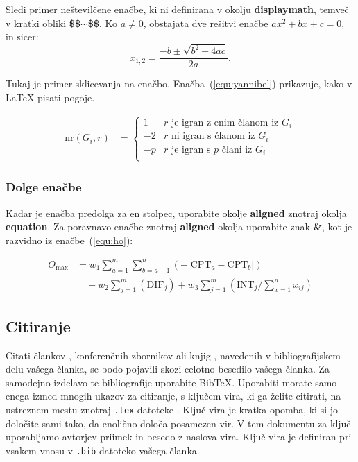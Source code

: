 \documentclass[article,slovene]{stucosrec}
\newcommand{\latex}{\LaTeX\xspace}
\newcommand{\bibtex}{Bib\TeX\xspace}
\begin{document}
	Sledi primer neštevilčene enačbe, ki ni definirana v okolju \textbf{displaymath}, temveč v kratki obliki \textbf{\$\$$\cdots$\$\$}.
	Ko $a \ne 0$, obstajata dve rešitvi enačbe $ax^2 + bx + c = 0$, in sicer: $$x_{1, 2} = \frac{-b \pm \sqrt{b^2-4ac}}{2a}.$$
	
	Tukaj je primer sklicevanja na enačbo. Enačba~(\ref{equ:yannibel}) prikazuje, kako v \latex pisati pogoje.
	
	\begin{equation}
		\begin{aligned} 
			\mathrm{nr}(G_i,r) & = \label{equ:yannibel}
			\begin{cases}
				1  & \text{$r$ je igran z enim članom iz $G_i$}\\
				-2 & \text{$r$ ni igran s članom iz $G_i$} \\
				-p & \text{$r$ je igran s $p$ člani iz $G_i$}\\
			\end{cases}
		\end{aligned}
	\end{equation}

	\subsubsection{Dolge enačbe}
	
	Kadar je enačba predolga za en stolpec, uporabite okolje \textbf{aligned} znotraj okolja \textbf{equation}.
	Za poravnavo enačbe znotraj \textbf{aligned} okolja uporabite znak \textbf{\&}, kot je razvidno iz enačbe~(\ref{equ:ho}):
	
	\begin{equation}
		\begin{aligned}
			O_{\max}& = w_1 \sum_{a=1}^{m} \sum_{b=a+1}^{n} (-\lvert\text{CPT}_a 
			-\text{CPT}_b\rvert)\\ 
			&\quad + w_2 \sum_{j=1}^{m} (\text{DIF}_j) + w_3 \sum_{j=1}^{m} 
			(\text{INT}_j/\sum_{x=1}^{n} x_{ij})
		\end{aligned}
		\label{equ:ho}
	\end{equation}

    \subsection{Citiranje}
	
	Citati člankov \cite{lecun2015deep, braams:babel, herlihy:methodology}, konferenčnih zbornikov \cite{vrbancic2019transfer, clark:pct} ali knjig \cite{salas:calculus, Lamport:LaTeX, fister2019computational}, navedenih
	v bibliografijskem delu vašega članka, se bodo pojavili skozi celotno besedilo vašega članka.
	Za samodejno izdelavo te bibliografije uporabite \bibtex. Uporabiti morate samo enega izmed mnogih ukazov za citiranje, s ključem vira, ki ga želite citirati, na ustreznem mestu znotraj \texttt{.tex} datoteke \cite{Lamport:LaTeX}.
	Ključ vira je kratka opomba, ki si jo določite sami tako, da enolično določa posamezen vir. V tem dokumentu za ključ uporabljamo avtorjev priimek in besedo z naslova vira.
	Ključ vira je definiran pri vsakem vnosu v \texttt{.bib} datoteko vašega članka.
	
\end{document}
